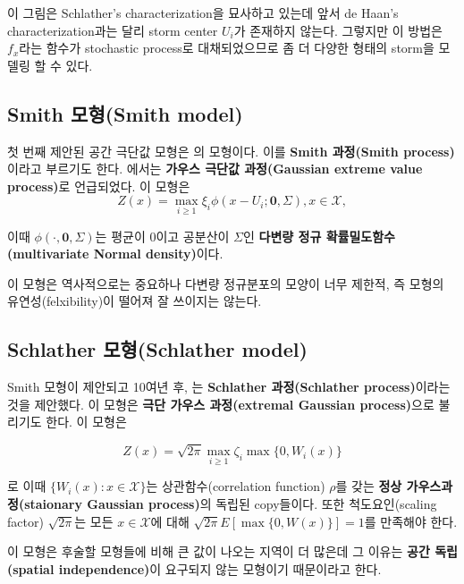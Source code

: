 \documentclass[b5paper,]{scrbook}
\theoremstyle{plain}
\theoremstyle{definition}
\numberwithin{equation}{section}
\begin{document}
이 그림은 Schlather's characterization을 묘사하고 있는데 앞서 de Haan's characterization과는 달리 storm center \(U_{i}\)가 존재하지 않는다. 그렇지만 이 방법은 \(f_{x}\)라는 함수가 stochastic process로 대채되었으므로 좀 더 다양한 형태의 storm을 모델링 할 수 있다.

\hypertarget{smith-smith-model}{%
\subsection{Smith 모형(Smith model)}\label{smith-smith-model}}

첫 번째 제안된 공간 극단값 모형은 \citep{Smith1990}의 모형이다. 이를 \textbf{Smith 과정(Smith process)}이라고 부르기도 한다. \citep{Schlather2002}에서는 \textbf{가우스 극단값 과정(Gaussian extreme value process)}로 언급되었다. 이 모형은
\[
\begin{equation}
Z(x)=\max_{i\geq 1}\xi_{i}\phi(x-U_{i};\mathbf{0},\Sigma), x\in\mathcal{X},
\end{equation}
\]

이때 \(\phi(\cdot, \mathbf{0},\Sigma)\)는 평균이 0이고 공분산이 \(\Sigma\)인 \textbf{다변량 정규 확률밀도함수(multivariate Normal density)}이다.

이 모형은 역사적으로는 중요하나 다변량 정규분포의 모양이 너무 제한적, 즉 모형의 유연성(felxibility)이 떨어져 잘 쓰이지는 않는다.

\hypertarget{schlather-schlather-model}{%
\subsection{Schlather 모형(Schlather model)}\label{schlather-schlather-model}}

Smith 모형이 제안되고 10여년 후, \citep{Schlather2002}는 \textbf{Schlather 과정(Schlather process)}이라는 것을 제안했다. 이 모형은 \textbf{극단 가우스 과정(extremal Gaussian process)}으로 불리기도 한다. 이 모형은

\[
\begin{equation}
Z(x)=\sqrt{2\pi}\max_{i\geq 1}\zeta_{i}\max\{0,W_{i}(x)\}
\end{equation}
\]

로 이때 \(\{W_{i}(x): x\in\mathcal{X}\}\)는 상관함수(correlation function) \(\rho\)를 갖는 \textbf{정상 가우스과정(staionary Gaussian process)}의 독립된 copy들이다. 또한 척도요인(scaling factor) \(\sqrt{2\pi}\)는 모든 \(x\in\mathcal{X}\)에 대해 \(\sqrt{2\pi}E[\max\{ 0,W(x)\}]=1\)를 만족해야 한다.

이 모형은 후술할 모형들에 비해 큰 값이 나오는 지역이 더 많은데 그 이유는 \textbf{공간 독립(spatial independence)}이 요구되지 않는 모형이기 때문이라고 한다.
\end{document}
